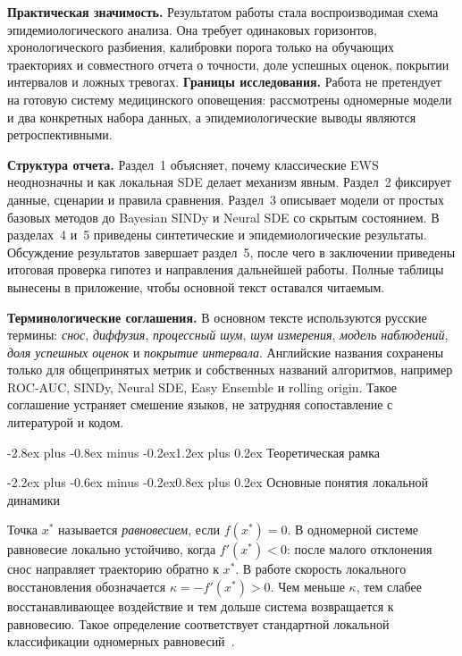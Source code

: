 \documentclass[12pt,a4paper]{article}
\makeatletter
\numberwithin{table}{section}
\numberwithin{figure}{section}
\renewcommand\section{\@startsection{section}{1}{0pt}
  {-2.8ex plus -0.8ex minus -0.2ex}{1.2ex plus 0.2ex}
  {\centering\normalfont\normalsize\bfseries}}
\renewcommand\subsection{\@startsection{subsection}{2}{0pt}
  {-2.2ex plus -0.6ex minus -0.2ex}{0.8ex plus 0.2ex}
  {\normalfont\normalsize\bfseries}}
\newcommand{\term}[1]{\textit{#1}}
\makeatother
\begin{document}
\textbf{Практическая значимость.} Результатом работы стала воспроизводимая схема
эпидемиологического анализа. Она требует одинаковых горизонтов, хронологического
разбиения, калибровки порога только на обучающих траекториях и совместного
отчета о точности, доле успешных оценок, покрытии интервалов и ложных тревогах.
\textbf{Границы исследования.} Работа не претендует на готовую систему
медицинского оповещения: рассмотрены одномерные модели и два конкретных
набора данных, а эпидемиологические выводы являются ретроспективными.

\textbf{Структура отчета.} Раздел~1 объясняет, почему классические EWS неоднозначны и как локальная SDE
делает механизм явным. Раздел~2 фиксирует данные, сценарии и правила сравнения.
Раздел~3 описывает модели от простых базовых методов до Bayesian SINDy и
Neural SDE со скрытым состоянием. В разделах~4 и~5 приведены синтетические и
эпидемиологические результаты.
Обсуждение результатов завершает раздел~5, после чего в заключении приведены
итоговая проверка гипотез и направления дальнейшей работы. Полные таблицы
вынесены в приложение, чтобы основной текст оставался читаемым.

\textbf{Терминологические соглашения.} В основном тексте используются русские термины: \term{снос},
\term{диффузия}, \term{процессный шум}, \term{шум измерения},
\term{модель наблюдений}, \term{доля успешных оценок} и
\term{покрытие интервала}. Английские названия сохранены только для
общепринятых метрик и собственных названий алгоритмов, например ROC-AUC,
SINDy, Neural SDE, Easy Ensemble и rolling origin. Такое соглашение устраняет
смешение языков, не затрудняя сопоставление с литературой и кодом.

\clearpage
\section{Теоретическая рамка}

\subsection{Основные понятия локальной динамики}

Точка $x^*$ называется \term{равновесием}, если $f(x^*)=0$. В одномерной
системе равновесие локально устойчиво, когда $f'(x^*)<0$: после малого
отклонения снос направляет траекторию обратно к $x^*$. В работе скорость
локального восстановления обозначается
$\kappa=-f'(x^*)>0$. Чем меньше $\kappa$, тем слабее восстанавливающее
воздействие и тем дольше система возвращается к равновесию. Такое определение
соответствует стандартной локальной классификации одномерных
равновесий~\cite{strogatz2015}.
\end{document}

